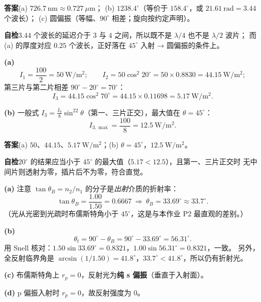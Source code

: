 \documentclass[11pt]{ctexart}
\begin{document}
\textbf{答案}\quad (a) $726.7\ \mathrm{nm}\approx0.727\ \mu\mathrm{m}$；
(b) $1238.4^\circ$（等价于 $158.4^\circ$，或 $21.61\ \mathrm{rad}=3.44$ 个波长）；
(c) 圆偏振（等幅、$90^\circ$ 相差；旋向按约定声明）。

\textbf{自检}\quad $3.44$ 个波长的延迟介于 $3$ 与 $4$ 之间，所以既不是 $\lambda/4$ 也不是 $\lambda/2$ 波片；
而 (a) 的厚度对应 $0.25$ 个波长，正好落在 $45^\circ$ 入射 → 圆偏振的条件上。


\textbf{(a)}
\[
I_1=\frac{100}{2}=50\ \mathrm{W/m^2};
\qquad
I_2=50\cos^2 20^\circ=50\times0.8830=44.15\ \mathrm{W/m^2};
\]
第三片与第二片相差 $90^\circ-20^\circ=70^\circ$：
\[
I_3=44.15\cos^2 70^\circ=44.15\times0.11698=5.17\ \mathrm{W/m^2}.
\]

\textbf{(b)} 一般式 $I_3=\frac{I_0}{8}\sin^22\theta$（第一、三片正交），最大值在 $\theta=45^\circ$：
\[
I_{3,\max}=\frac{100}{8}=12.5\ \mathrm{W/m^2}.
\]

\textbf{答案}\quad (a) $50$、$44.15$、$5.17\ \mathrm{W/m^2}$；(b) $\theta=45^\circ$，$12.5\ \mathrm{W/m^2}$。

\textbf{自检}\quad $20^\circ$ 的结果应当小于 $45^\circ$ 的最大值（$5.17<12.5$），且第一、三片正交时
无中间片则透射为零，插片后不为零，符合直觉。


\textbf{(a)} 注意 $\tan\theta_B=n_2/n_1$ 的分子是\emph{出射}介质的折射率：
\[
\tan\theta_B=\frac{1.00}{1.50}=0.6667
\ \Longrightarrow\
\theta_B=33.69^\circ\approx33.7^\circ .
\]
（光从光密到光疏时布儒斯特角小于 $45^\circ$，这是与本作业 P2 最直观的差别。）

\textbf{(b)}
\[
\theta_t=90^\circ-\theta_B=90^\circ-33.69^\circ=56.31^\circ .
\]
用 Snell 核对：$1.50\sin33.69^\circ=0.8321$，$1.00\sin56.31^\circ=0.8321$，一致。
另外，全反射临界角是 $\arcsin(1/1.50)=41.8^\circ$，$33.7^\circ<41.8^\circ$，所以仍有折射光。

\textbf{(c)} 布儒斯特角上 $r_p=0$，反射光为\textbf{纯 s 偏振}（垂直于入射面）。

\textbf{(d)} p 偏振入射时 $r_p=0$，故反射强度为 $0$。
\end{document}
